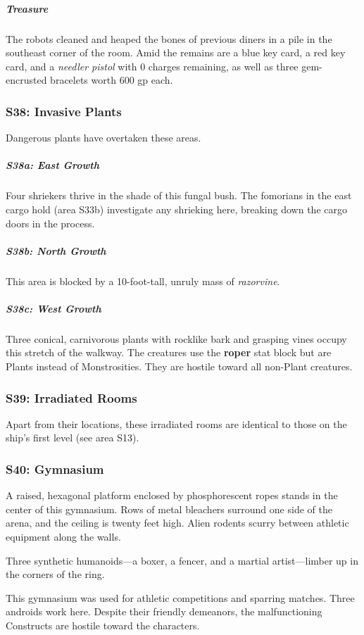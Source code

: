 \documentclass[10pt,a4paper,twoside,bg=print,twocolumn,openany,nodeprecatedcode]{dndbook}
\begin{document}
\subparagraph{Treasure}
The robots cleaned and heaped the bones of previous diners in a pile in the southeast corner of the room. Amid the remains are a blue key card, a red key card, and a \textit{needler pistol} with 0 charges remaining, as well as three gem-encrusted bracelets worth 600 gp each.

\subsubsection{S38: Invasive Plants}
Dangerous plants have overtaken these areas.

\subparagraph{S38a: East Growth}
Four shriekers thrive in the shade of this fungal bush. The fomorians in the east cargo hold (area S33b) investigate any shrieking here, breaking down the cargo doors in the process.

\subparagraph{S38b: North Growth}
This area is blocked by a 10-foot-tall, unruly mass of \textit{razorvine}.

\subparagraph{S38c: West Growth}
Three conical, carnivorous plants with rocklike bark and grasping vines occupy this stretch of the walkway. The creatures use the \textbf{roper} stat block but are Plants instead of Monstrosities. They are hostile toward all non-Plant creatures.

\subsubsection{S39: Irradiated Rooms}
Apart from their locations, these irradiated rooms are identical to those on the ship's first level (see area S13).

\subsubsection{S40: Gymnasium}
\begin{DndReadAloud}{}
A raised, hexagonal platform enclosed by phosphorescent ropes stands in the center of this gymnasium. Rows of metal bleachers surround one side of the arena, and the ceiling is twenty feet high. Alien rodents scurry between athletic equipment along the walls.

Three synthetic humanoids—a boxer, a fencer, and a martial artist—limber up in the corners of the ring.

\end{DndReadAloud}

This gymnasium was used for athletic competitions and sparring matches. Three androids work here. Despite their friendly demeanors, the malfunctioning Constructs are hostile toward the characters.
\end{document}
